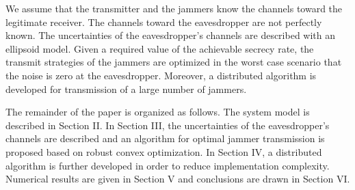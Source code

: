 \documentclass[conference]{IEEEtran}
\begin{document}
We assume that the transmitter and the jammers know the channels toward the legitimate receiver.  The channels toward the eavesdropper are not perfectly known.  The uncertainties of the eavesdropper's channels are described with an ellipsoid model.   Given a required value of the achievable secrecy rate, the transmit strategies of the jammers are optimized in the worst case scenario that the noise is zero at the eavesdropper.  Moreover, a distributed algorithm is developed for transmission of a large number of jammers. 

The remainder of the paper is organized as follows.  The system model is described in Section II.  In Section III, the uncertainties of the eavesdropper's channels are described and an algorithm for optimal jammer transmission is proposed based on robust convex optimization.  In Section IV, a distributed algorithm is further developed in order to reduce implementation complexity.  Numerical results are given in Section V and conclusions are drawn in Section VI.
\end{document}
